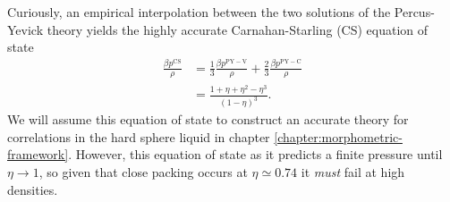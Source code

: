Curiously, an empirical interpolation between the two solutions of the Percus-Yevick theory yields the highly accurate Carnahan-Starling (CS) equation of state \cite{CarnahanJCP1969}
\begin{equation}\label{eq:cs-pressure}
  \begin{split}
    \frac{\beta p^\mathrm{CS}}{\rho}
    &=
    \frac{1}{3} \frac{\beta p^\mathrm{PY-V}}{\rho}
    + \frac{2}{3} \frac{\beta p^\mathrm{PY-C}}{\rho}
    \\ &=
    \frac{1 + \eta + \eta^2 - \eta^3}{(1-\eta)^3}.
  \end{split}
\end{equation}
We will assume this equation of state to construct an accurate theory for correlations in the hard sphere liquid in chapter \ref{chapter:morphometric-framework}.
However, this equation of state as it predicts a finite pressure until $\eta \to 1$, so given that close packing occurs at $\eta \simeq 0.74$ it \emph{must} fail at high densities.

